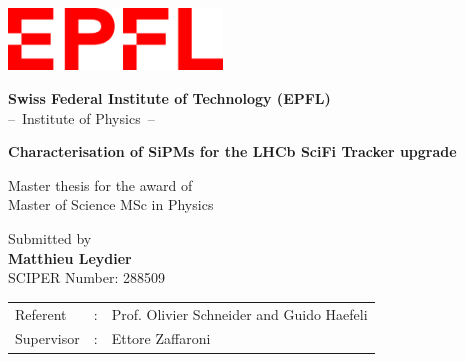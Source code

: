 \thispagestyle{empty}
\begin{titlepage}

  \condTWOSIDE{\changetext{}{19mm}{}{19mm}{}}

  \vspace{1cm}
  \begin{center}
    \includegraphics[width=5.7cm]{gfx/logoep.png} \\ 
  \end{center}

  \begin{center}
    \vspace{0.1cm}
    \huge \textbf{Swiss Federal Institute of Technology (EPFL)}\\
    \vspace{0.4cm}
    \LARGE --~Institute of Physics~--
  \end{center}

  \vfill
  \vfill

  \begin{center}
    \LARGE \textbf{Characterisation of SiPMs for the LHCb SciFi Tracker upgrade}
  \end{center} 

  \vfill
  \vfill

  \begin{center}
    \Large Master thesis for the award of \\
    \vspace{0.3cm}
    \Large Master of Science MSc in Physics
  \end{center}

  \vfill

  \begin{center}
    \Large Submitted by\\
    \vspace{0.3cm}
    \Large \textbf{Matthieu Leydier}\\
    \vspace{0.3cm}
    \normalsize SCIPER Number: 288509
  \end{center}

  \vfill
  \vfill

  \begin{center}
    \begin{tabular}{lll}
      Referent    & : & Prof. Olivier Schneider and Guido Haefeli \\
      Supervisor & : & Ettore Zaffaroni  
    \end{tabular}
  \end{center} 

  \condTWOSIDE{\changetext{}{-19mm}{}{-19mm}{}}

\end{titlepage}
